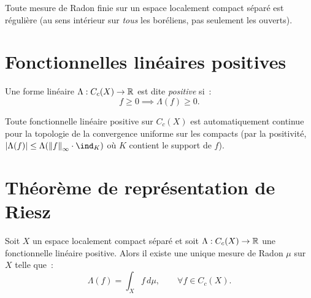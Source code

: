 \begin{proposition}
Toute mesure de Radon finie sur un espace localement compact s\'epar\'e est
r\'eguli\`ere (au sens int\'erieur sur \emph{tous} les bor\'eliens, pas seulement les
ouverts).
\end{proposition}

\section{Fonctionnelles lin\'eaires positives}

\begin{definition}
Une forme lin\'eaire $\Lambda : C_c(X) \to \mathbb{R}$ est dite \emph{positive} si~:
\[
    f \geq 0 \implies \Lambda(f) \geq 0.
\]
\end{definition}

\begin{remarque}
Toute fonctionnelle lin\'eaire positive sur $C_c(X)$ est automatiquement continue
pour la topologie de la convergence uniforme sur les compacts (par la positivit\'e,
$\abs{\Lambda(f)} \leq \Lambda(\norm{f}_\infty \cdot \ind_K)$ o\`u $K$ contient le
support de $f$).
\end{remarque}

\section{Th\'eor\`eme de repr\'esentation de Riesz}

\begin{theoreme}
\label{thm:riesz}
Soit $X$ un espace localement compact s\'epar\'e et soit $\Lambda : C_c(X) \to \mathbb{R}$
une fonctionnelle lin\'eaire positive. Alors il existe une unique mesure de Radon $\mu$
sur $X$ telle que~:
\[
    \Lambda(f) = \int_X f\, d\mu, \qquad \forall f \in C_c(X).
\]
\end{theoreme}

